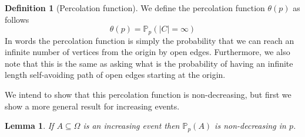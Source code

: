 \documentclass[a4paper,11pt]{article}
\newtheorem{lemma}[theorem]{Lemma}
\theoremstyle{definition}
\newtheorem{definition}[theorem]{Definition}
\newcommand{\prob}{\mathbb{P}_p}
\begin{document}
\begin{definition}[Percolation function]
	We define the percolation function $\theta(p)$ as follows
	$$\theta(p) = \prob(|C| = \infty)$$
	In words the percolation function is simply the probability that we can reach an infinite number of vertices from the origin by open edges. 
	Furthermore, we also note that this is the same as asking what is the probability of having an infinite length self-avoiding path of open edges starting at the origin.
\end{definition}

We intend to show that this percolation function is non-decreasing, but first we show a more general result for increasing events.

\begin{lemma} \label{incEventlemma}
	If $A \subseteq \Omega$ is an increasing event then $\prob(A)$ is non-decreasing in $p$. 
\end{lemma}
\end{document}
